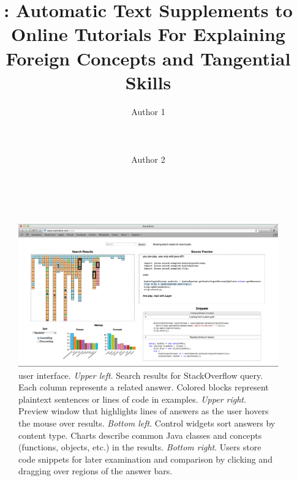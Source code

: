\documentclass{sigchi}
\begin{document}
\title{\systemname{}: Automatic Text Supplements to Online Tutorials For Explaining Foreign Concepts and Tangential Skills}

\author{
  \alignauthor Author 1\\
    \\
    \\
    \\
  \alignauthor Author 2\\
    \\
    \\
}

\makeatletter
\let\@oldmaketitle\@maketitle
\renewcommand{\@maketitle}{\@oldmaketitle}
\makeatother

\maketitle





\begin{figure}
 \centering
 \includegraphics[width=.9\linewidth]{figures/ui_full}
 \caption{\systemname{} user interface. 
 \emph{Upper left}.
 Search results for StackOverflow query.
 Each column represents a related answer.
 Colored blocks represent plaintext sentences or lines of code in examples.
 \emph{Upper right}.
 Preview window that highlights lines of answers as the user hovers the mouse over results.
 \emph{Bottom left}.
 Control widgets sort answers by content type.
 Charts describe common Java classes and concepts (functions, objects, etc.) in the results.
 \emph{Bottom right}.
 Users store code snippets for later examination and comparison by clicking and dragging over regions of the answer bars.
 }
 \label{fig:user_interface}
\end{figure}
\end{document}
